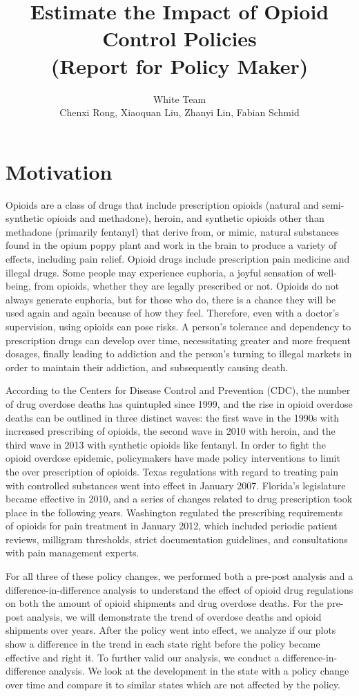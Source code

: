 \documentclass[12pt,letterpaper]{article}
\author{White Team \\ Chenxi Rong, Xiaoquan Liu, Zhanyi Lin, Fabian Schmid}
\title{Estimate the Impact of Opioid Control Policies \\ (Report for Policy Maker)}
\begin{document}
\maketitle

\section{Motivation}
Opioids are a class of drugs that include prescription opioids (natural and semi-synthetic opioids and methadone), heroin, and synthetic opioids other than methadone (primarily fentanyl) that derive from, or mimic, natural substances found in the opium poppy plant and work in the brain to produce a variety of effects, including pain relief. Opioid drugs include prescription pain medicine and illegal drugs. Some people may experience euphoria, a joyful sensation of well-being, from opioids, whether they are legally prescribed or not. Opioids do not always generate euphoria, but for those who do, there is a chance they will be used again and again because of how they feel. Therefore, even with a doctor's supervision, using opioids can pose risks. A person's tolerance and dependency to prescription drugs can develop over time, necessitating greater and more frequent dosages, finally leading to addiction and the person's turning to illegal markets in order to maintain their addiction, and subsequently causing death.

According to the Centers for Disease Control and Prevention (CDC), the number of drug overdose deaths has quintupled since 1999, and the rise in opioid overdose deaths can be outlined in three distinct waves: the first wave in the 1990s with increased prescribing of opioids, the second wave in 2010 with heroin, and the third wave in 2013 with synthetic opioids like fentanyl. In order to fight the opioid overdose epidemic, policymakers have made policy interventions to limit the over prescription of opioids. Texas regulations with regard to treating pain with controlled substances went into effect in January 2007. Florida’s legislature became effective in 2010, and a series of changes related to drug prescription took place in the following years. Washington regulated the prescribing requirements of opioids for pain treatment in January 2012, which included periodic patient reviews, milligram thresholds, strict documentation guidelines, and consultations with pain management experts.

For all three of these policy changes, we performed both a pre-post analysis and a difference-in-difference analysis to understand the effect of opioid drug regulations on both the amount of opioid shipments and drug overdose deaths. For the pre-post analysis, we will demonstrate the trend of overdose deaths and opioid shipments over years. After the policy went into effect, we analyze if our plots show a difference in the trend in each state right before the policy became effective and right it. To further valid our analysis, we conduct a difference-in-difference analysis. We look at the development in the state with a policy change over time and compare it to similar states which are not affected by the policy.
\end{document}
